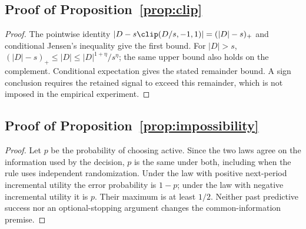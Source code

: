 \subsection{Proof of Proposition~\ref{prop:clip}}
\begin{proof}
The pointwise identity
$|D-s\clip(D/s,-1,1)|=(|D|-s)_+$
and conditional Jensen's inequality give the first bound. For $|D|>s$,
$(|D|-s)_+\le |D|\le |D|^{1+\eta}/s^\eta$; the same upper bound also holds on the complement. Conditional expectation gives the stated remainder bound. A sign conclusion requires the retained signal to exceed this remainder, which is not imposed in the empirical experiment.
\end{proof}

\subsection{Proof of Proposition~\ref{prop:impossibility}}
\begin{proof}
Let $p$ be the probability of choosing active. Since the two laws agree on the information used by the decision, $p$ is the same under both, including when the rule uses independent randomization. Under the law with positive next-period incremental utility the error probability is $1-p$; under the law with negative incremental utility it is $p$. Their maximum is at least $1/2$. Neither past predictive success nor an optional-stopping argument changes the common-information premise.
\end{proof}

